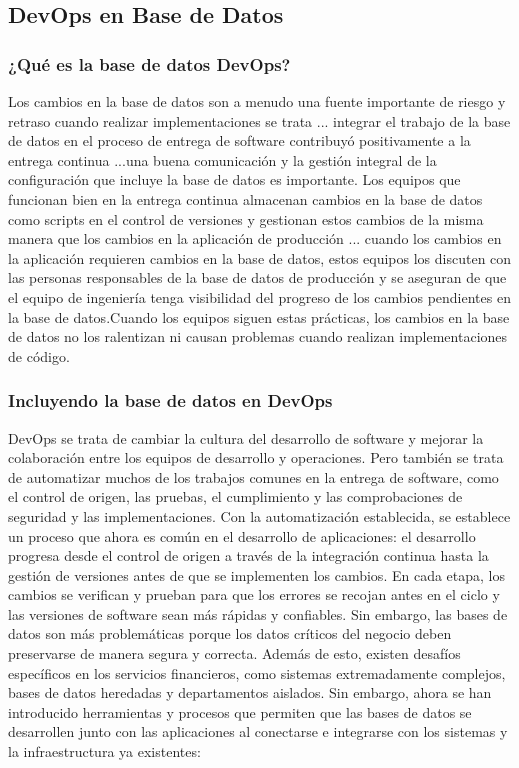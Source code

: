\documentclass[preprint,12pt]{elsarticle}
\begin{document}

\subsection{\textbf{DevOps en Base de Datos}}

\subsubsection{\textbf{¿Qué es la base de datos DevOps?}}

Los cambios en la base de datos son a menudo una fuente importante de riesgo y retraso cuando realizar implementaciones se trata ... integrar el trabajo de la base de datos en el proceso de entrega de software contribuyó positivamente a la entrega continua ...una buena comunicación y la gestión integral de la configuración que incluye la base de datos es importante. Los equipos que funcionan bien en la entrega continua almacenan cambios en la base de datos como scripts en el control de versiones y gestionan estos cambios de la misma manera que los cambios en la aplicación de producción ... cuando los cambios en la aplicación requieren cambios en la base de datos, estos equipos los discuten con las personas responsables de la base de datos de producción y se aseguran de que el equipo de ingeniería tenga visibilidad del progreso de los cambios pendientes en la base de datos.Cuando los equipos siguen estas prácticas, los cambios en la base de datos no los ralentizan ni causan problemas cuando realizan implementaciones de código. \cite{DevopsBD}

\subsubsection{\textbf{Incluyendo la base de datos en DevOps}}

DevOps se trata de cambiar la cultura del desarrollo de software y mejorar la colaboración entre los equipos de desarrollo y operaciones. Pero también se trata de automatizar muchos de los trabajos comunes en la entrega de software, como el control de origen, las pruebas, el cumplimiento y las comprobaciones de seguridad y las implementaciones. Con la automatización establecida, se establece un proceso que ahora es común en el desarrollo de aplicaciones: el desarrollo progresa desde el control de origen a través de la integración continua hasta la gestión de versiones antes de que se implementen los cambios. En cada etapa, los cambios se verifican y prueban para que los errores se recojan antes en el ciclo y las versiones de software sean más rápidas y confiables. Sin embargo, las bases de datos son más problemáticas porque los datos críticos del negocio deben preservarse de manera segura y correcta. Además de esto, existen desafíos específicos en los servicios financieros, como sistemas extremadamente complejos, bases de datos heredadas y departamentos aislados. Sin embargo, ahora se han introducido herramientas y procesos que permiten que las bases de datos se desarrollen junto con las aplicaciones al conectarse e integrarse con los sistemas y la infraestructura ya existentes: \cite{DevopsBD2}
\end{document}
